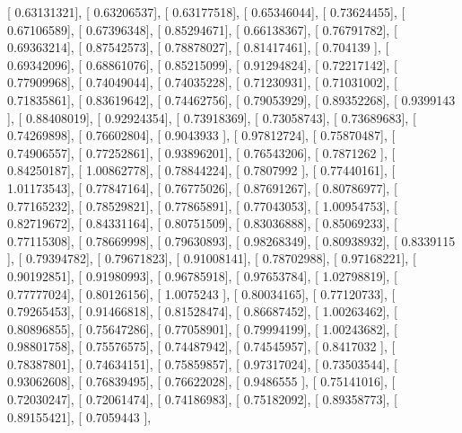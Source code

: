 \documentclass{article}
\begin{document}
       [ 0.63131321],
       [ 0.63206537],
       [ 0.63177518],
       [ 0.65346044],
       [ 0.73624455],
       [ 0.67106589],
       [ 0.67396348],
       [ 0.85294671],
       [ 0.66138367],
       [ 0.76791782],
       [ 0.69363214],
       [ 0.87542573],
       [ 0.78878027],
       [ 0.81417461],
       [ 0.704139  ],
       [ 0.69342096],
       [ 0.68861076],
       [ 0.85215099],
       [ 0.91294824],
       [ 0.72217142],
       [ 0.77909968],
       [ 0.74049044],
       [ 0.74035228],
       [ 0.71230931],
       [ 0.71031002],
       [ 0.71835861],
       [ 0.83619642],
       [ 0.74462756],
       [ 0.79053929],
       [ 0.89352268],
       [ 0.9399143 ],
       [ 0.88408019],
       [ 0.92924354],
       [ 0.73918369],
       [ 0.73058743],
       [ 0.73689683],
       [ 0.74269898],
       [ 0.76602804],
       [ 0.9043933 ],
       [ 0.97812724],
       [ 0.75870487],
       [ 0.74906557],
       [ 0.77252861],
       [ 0.93896201],
       [ 0.76543206],
       [ 0.7871262 ],
       [ 0.84250187],
       [ 1.00862778],
       [ 0.78844224],
       [ 0.7807992 ],
       [ 0.77440161],
       [ 1.01173543],
       [ 0.77847164],
       [ 0.76775026],
       [ 0.87691267],
       [ 0.80786977],
       [ 0.77165232],
       [ 0.78529821],
       [ 0.77865891],
       [ 0.77043053],
       [ 1.00954753],
       [ 0.82719672],
       [ 0.84331164],
       [ 0.80751509],
       [ 0.83036888],
       [ 0.85069233],
       [ 0.77115308],
       [ 0.78669998],
       [ 0.79630893],
       [ 0.98268349],
       [ 0.80938932],
       [ 0.8339115 ],
       [ 0.79394782],
       [ 0.79671823],
       [ 0.91008141],
       [ 0.78702988],
       [ 0.97168221],
       [ 0.90192851],
       [ 0.91980993],
       [ 0.96785918],
       [ 0.97653784],
       [ 1.02798819],
       [ 0.77777024],
       [ 0.80126156],
       [ 1.0075243 ],
       [ 0.80034165],
       [ 0.77120733],
       [ 0.79265453],
       [ 0.91466818],
       [ 0.81528474],
       [ 0.86687452],
       [ 1.00263462],
       [ 0.80896855],
       [ 0.75647286],
       [ 0.77058901],
       [ 0.79994199],
       [ 1.00243682],
       [ 0.98801758],
       [ 0.75576575],
       [ 0.74487942],
       [ 0.74545957],
       [ 0.8417032 ],
       [ 0.78387801],
       [ 0.74634151],
       [ 0.75859857],
       [ 0.97317024],
       [ 0.73503544],
       [ 0.93062608],
       [ 0.76839495],
       [ 0.76622028],
       [ 0.9486555 ],
       [ 0.75141016],
       [ 0.72030247],
       [ 0.72061474],
       [ 0.74186983],
       [ 0.75182092],
       [ 0.89358773],
       [ 0.89155421],
       [ 0.7059443 ],
\end{document}
